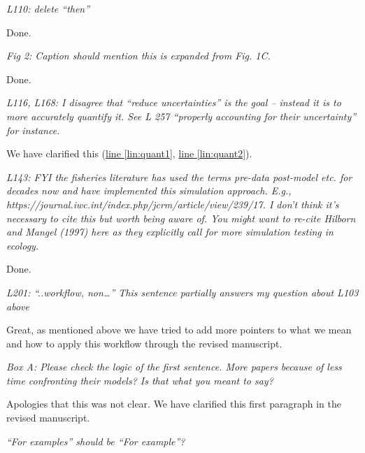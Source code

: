 \documentclass[11pt,letter]{article}
\begin{document}
\begin{mybox}
\emph{L110: delete “then”}
\end{mybox}

Done. %

\begin{mybox}
\emph{Fig 2: Caption should mention this is expanded from Fig. 1C.}
\end{mybox}

Done.

\begin{mybox}
\emph{L116, L168: I disagree that “reduce uncertainties” is the goal – instead it is to more accurately quantify it. See L 257 “properly accounting for their uncertainty” for instance.}
\end{mybox}

We have clarified this (\href{file:forecastflows_r1\#lintarget:quant1}{line \ref*{lin:quant1}}, \href{file:forecastflows_r1\#lintarget:quant2}{line \ref*{lin:quant2}}).

\begin{mybox}
\emph{L143: FYI the fisheries literature has used the terms pre-data post-model etc. for decades now and have implemented this simulation approach. E.g., https://journal.iwc.int/index.php/jcrm/article/view/239/17. I don’t think it’s necessary to cite this but worth being aware of. You might want to re-cite Hilborn and Mangel (1997) here as they explicitly call for more simulation testing in ecology.}
\end{mybox}

Done.

\begin{mybox}
\emph{L201: “..workflow, non…” This sentence partially answers my question about L103 above}
\end{mybox}

Great, as mentioned above we have tried to add more pointers to what we mean and how to apply this workflow through the revised manuscript. 

\begin{mybox}
\emph{Box A: Please check the logic of the first sentence. More papers because of less time confronting their models? Is that what you meant to say?}
\end{mybox} 

Apologies that this was not clear. We have clarified this first paragraph in the revised manuscript.

\begin{mybox}
\emph{“For examples” should be “For example”?}
\end{mybox} 
\end{document}
